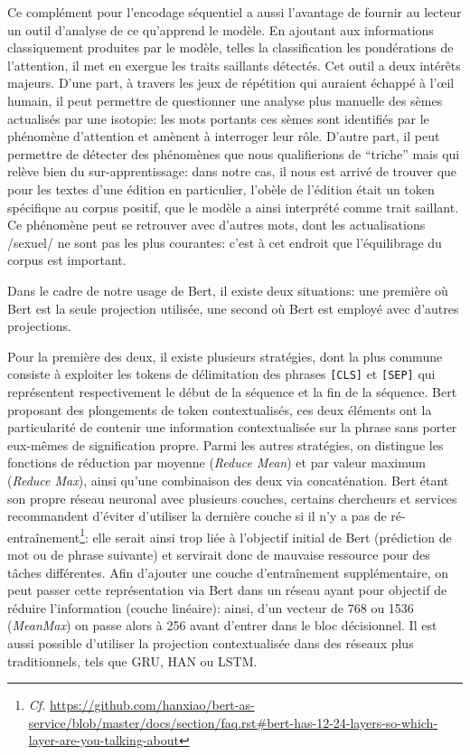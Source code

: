 Ce complément pour l'encodage séquentiel a aussi l'avantage de fournir au lecteur un outil d'analyse de ce qu'apprend le modèle. En ajoutant aux informations classiquement produites par le modèle, telles la classification les pondérations de l'attention, il met en exergue les traits saillants détectés. Cet outil a deux intérêts majeurs. D'une part, à travers les jeux de répétition qui auraient échappé à l'œil humain, il peut permettre de questionner une analyse plus manuelle des sèmes actualisés par une isotopie: les mots portants ces sèmes sont identifiés par le phénomène d'attention et amènent à interroger leur rôle. D'autre part, il peut permettre de détecter des phénomènes que nous qualifierions de \enquote{triche} mais qui relève bien du sur-apprentissage: dans notre cas, il nous est arrivé de trouver que pour les textes d'une édition en particulier, l'obèle de l'édition était un token spécifique au corpus positif, que le modèle a ainsi interprété comme trait saillant. Ce phénomène peut se retrouver avec d'autres mots, dont les actualisations /sexuel/ ne sont pas les plus courantes: c'est à cet endroit que l'équilibrage du corpus est important.

Dans le cadre de notre usage de Bert, il existe deux situations: une première où Bert est la seule projection utilisée, une second où Bert est employé avec d'autres projections.

Pour la première des deux, il existe plusieurs stratégies, dont la plus commune consiste à exploiter les tokens de délimitation des phrases \texttt{[CLS]} et \texttt{[SEP]} qui représentent respectivement le début de la séquence et la fin de la séquence. Bert proposant des plongements de token contextualisés, ces deux éléments ont la particularité de contenir une information contextualisée sur la phrase sans porter eux-mêmes de signification propre. Parmi les autres stratégies, on distingue les fonctions de réduction par moyenne (\textit{Reduce Mean}) et par valeur maximum (\textit{Reduce Max}), ainsi qu'une combinaison des deux via concaténation. Bert étant son propre réseau neuronal avec plusieurs couches, certains chercheurs et services recommandent d'éviter d'utiliser la dernière couche si il n'y a pas de ré-entraînement\footnote{\textit{Cf.} \url{https://github.com/hanxiao/bert-as-service/blob/master/docs/section/faq.rst\#bert-has-12-24-layers-so-which-layer-are-you-talking-about}}: elle serait ainsi trop liée à l'objectif initial de Bert (prédiction de mot ou de phrase suivante) et servirait donc de mauvaise ressource pour des tâches différentes. Afin d'ajouter une couche d'entraînement supplémentaire, on peut passer cette représentation via Bert dans un réseau ayant pour objectif de réduire l'information (couche linéaire): ainsi, d'un vecteur de 768 ou 1536 (\textit{MeanMax}) on passe alors à 256 avant d'entrer dans le bloc décisionnel. Il est aussi possible d'utiliser la projection contextualisée dans des réseaux plus traditionnels, tels que GRU, HAN ou LSTM.

